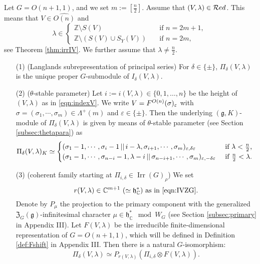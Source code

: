 \begin{theorem}
\label{thm:1808116}
Let $G=O(n+1,1)$, 
 and we set $m:=[\frac n 2]$.  
Assume that $(V, \lambda)\in{\mathcal{R}}ed$.  
This means that $V \in \widehat{O(n)}$ and
\[
  \lambda \in 
\begin{cases}
  {\mathbb{Z}} \setminus S(V)
  \quad&\text{if $n=2m+1$, }
\\
{\mathbb{Z}} \setminus (S(V) \cup S_Y(V))
  \quad&\text{if $n=2m$, }
\end{cases}
\]
see Theorem \ref{thm:irrIV}.  
We further assume that $\lambda \ne \frac n 2$.  
\begin{enumerate}
\item[{\rm{(1)}}]
{\rm{(Langlands subrepresentation of principal series)}}\enspace
For $\delta \in \{\pm\}$, 
 $\Pi_{\delta}(V, \lambda)$ is the unique proper $G$-submodule
 of $I_{\delta}(V, \lambda)$.  

\item[{\rm{(2)}}]
{\rm{($\theta$-stable parameter)}}
\enspace
Let $i:=i(V,\lambda) \in \{0,1,\ldots,n\}$
 be the height of $(V,\lambda)$
 as in \eqref{eqn:indexV}.  
We write $V=F^{{O(n)}}({\sigma})_{\varepsilon}$
 with $\sigma=(\sigma_1, \cdots,\sigma_m) \in \Lambda^+(m)$
 and $\varepsilon \in \{\pm\}$.   
Then the underlying $({\mathfrak {g}}, K)$-module of $\Pi_{\delta}(V, \lambda)$
 is given by means of $\theta$-stable parameter
 (see Section \ref{subsec:thetapara})
 as 
\[
\Pi_{\delta}(V, \lambda)_K
\simeq
\begin{cases}
({\sigma_1-1, \cdots, \sigma_i-1}\,||\,{i-\lambda,\sigma_{i+1}, \cdots, \sigma_m})_{\varepsilon,\delta \varepsilon}
&\text{if $\lambda < \frac n 2$, }
\\
({\sigma_1-1, \cdots, \sigma_{n-i}-1, \lambda-i}\,||\,{\sigma_{n-i+1}, \cdots, \sigma_m})_{\varepsilon,-\delta \varepsilon}
\,\,
&\text{if $\frac n 2< \lambda$.  }
\end{cases}
\]

\item[{\rm{(3)}}]
{\rm{(coherent family starting at $\Pi_{i,\delta} \in \operatorname{Irr}(G)_{\rho}$)}}\enspace
We set 
\begin{equation*}
   \text{$r(V, \lambda)\in {\mathbb{C}}^{m+1}$ $(\simeq {\mathfrak{h}}_{\mathbb{C}}^{\ast})$ 
         as in \eqref{eqn:IVZG}}.  
\end{equation*}
Denote by 
$P_{\mu}$ 
the projection to the primary component 
 with the generalized ${\mathfrak{Z}}_G({\mathfrak{g}})$-infinitesimal character
 $\mu \in {\mathfrak{h}}_{\mathbb{C}}^{\ast} \mod W_G$
 (see Section \ref{subsec:primary} in Appendix III).  
Let 
$F(V,\lambda)$ be the irreducible finite-dimensional representation
 of $G=O(n+1,1)$, 
 which will be defined in Definition \ref{def:Fshift} 
 in Appendix III.  
Then there is a natural $G$-isomorphism:
\[
\Pi_{\delta}(V,\lambda)
\simeq
P_{r(V, \lambda)}(\Pi_{i,\delta} \otimes F(V,\lambda)). 
\]


\end{enumerate}
\end{theorem}
